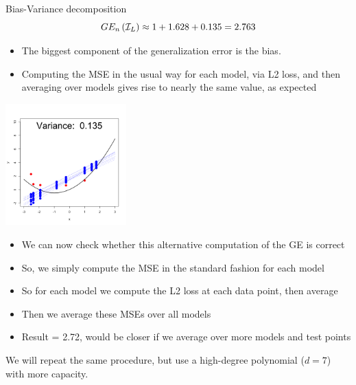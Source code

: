 \documentclass[11pt,compress,t,notes=noshow, xcolor=table]{beamer}
\begin{document}
\begin{vbframe} {Bias-Variance decomposition}
$$GE_n\left(\mathcal{I}_{L}\right) \approx 1 + 1.628 + 0.135 = 2.763 $$


\begin{itemize}
  \item The biggest component of the generalization error is the bias.
  \item Computing the MSE in the usual way for each model, via L2 loss, and then averaging over models gives rise to nearly the same value, as expected
\end{itemize}

\framebreak

\begin{center}
  \includegraphics[width = 0.35\textwidth]{figure/bias_variance_decomposition-linear_model_variance.png}
\end{center}

\begin{footnotesize}

\begin{itemize}
  \item We can now check whether this alternative computation of the GE is correct
  \item So, we simply compute the MSE in the standard fashion for each model
  \item So for each model we compute the L2 loss at each data point, then average
  \item Then we average these MSEs over all models
  \item Result = 2.72, would be closer if we average over more models and test points 
\end{itemize}

\end{footnotesize}


\framebreak


We will repeat the same procedure, but use a high-degree polynomial ($d=7$) with more capacity.


\end{vbframe}
\end{document}
